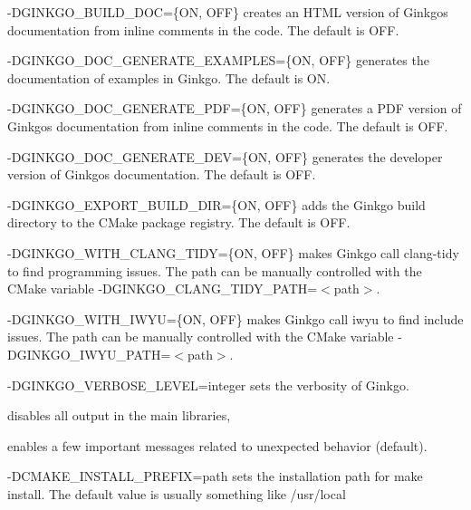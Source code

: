 \begin{DoxyItemize}
\item {\ttfamily -\/\+D\+G\+I\+N\+K\+G\+O\+\_\+\+B\+U\+I\+L\+D\+\_\+\+D\+OC=\{ON, O\+FF\}} creates an H\+T\+ML version of Ginkgo\textquotesingle{}s documentation from inline comments in the code. The default is {\ttfamily O\+FF}.
\item {\ttfamily -\/\+D\+G\+I\+N\+K\+G\+O\+\_\+\+D\+O\+C\+\_\+\+G\+E\+N\+E\+R\+A\+T\+E\+\_\+\+E\+X\+A\+M\+P\+L\+ES=\{ON, O\+FF\}} generates the documentation of examples in Ginkgo. The default is {\ttfamily ON}.
\item {\ttfamily -\/\+D\+G\+I\+N\+K\+G\+O\+\_\+\+D\+O\+C\+\_\+\+G\+E\+N\+E\+R\+A\+T\+E\+\_\+\+P\+DF=\{ON, O\+FF\}} generates a P\+DF version of Ginkgo\textquotesingle{}s documentation from inline comments in the code. The default is {\ttfamily O\+FF}.
\item {\ttfamily -\/\+D\+G\+I\+N\+K\+G\+O\+\_\+\+D\+O\+C\+\_\+\+G\+E\+N\+E\+R\+A\+T\+E\+\_\+\+D\+EV=\{ON, O\+FF\}} generates the developer version of Ginkgo\textquotesingle{}s documentation. The default is {\ttfamily O\+FF}.
\item {\ttfamily -\/\+D\+G\+I\+N\+K\+G\+O\+\_\+\+E\+X\+P\+O\+R\+T\+\_\+\+B\+U\+I\+L\+D\+\_\+\+D\+IR=\{ON, O\+FF\}} adds the Ginkgo build directory to the C\+Make package registry. The default is {\ttfamily O\+FF}.
\item {\ttfamily -\/\+D\+G\+I\+N\+K\+G\+O\+\_\+\+W\+I\+T\+H\+\_\+\+C\+L\+A\+N\+G\+\_\+\+T\+I\+DY=\{ON, O\+FF\}} makes Ginkgo call {\ttfamily clang-\/tidy} to find programming issues. The path can be manually controlled with the C\+Make variable {\ttfamily -\/\+D\+G\+I\+N\+K\+G\+O\+\_\+\+C\+L\+A\+N\+G\+\_\+\+T\+I\+D\+Y\+\_\+\+P\+A\+TH=$<$path$>$}.
\item {\ttfamily -\/\+D\+G\+I\+N\+K\+G\+O\+\_\+\+W\+I\+T\+H\+\_\+\+I\+W\+YU=\{ON, O\+FF\}} makes Ginkgo call {\ttfamily iwyu} to find include issues. The path can be manually controlled with the C\+Make variable {\ttfamily -\/\+D\+G\+I\+N\+K\+G\+O\+\_\+\+I\+W\+Y\+U\+\_\+\+P\+A\+TH=$<$path$>$}.
\item {\ttfamily -\/\+D\+G\+I\+N\+K\+G\+O\+\_\+\+V\+E\+R\+B\+O\+S\+E\+\_\+\+L\+E\+V\+EL=integer} sets the verbosity of Ginkgo.
\begin{DoxyItemize}
\item {} disables all output in the main libraries,
\item {} enables a few important messages related to unexpected behavior (default).
\end{DoxyItemize}
\item {\ttfamily -\/\+D\+C\+M\+A\+K\+E\+\_\+\+I\+N\+S\+T\+A\+L\+L\+\_\+\+P\+R\+E\+F\+IX=path} sets the installation path for {\ttfamily make install}. The default value is usually something like {\ttfamily /usr/local}

\end{DoxyItemize}
